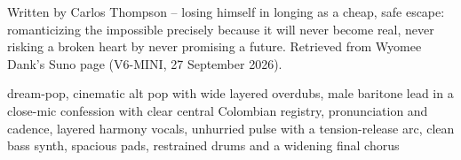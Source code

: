 
\label{sec:perderme-en-el-anhelo}
\begin{notes}
Written by Carlos Thompson -- losing himself in longing as a cheap, safe escape: romanticizing the impossible precisely because it will never become real, never risking a broken heart by never promising a future. Retrieved from Wyomee Dank's Suno page (V6-MINI, 27 September 2026).
\end{notes}
\begin{style}
dream-pop, cinematic alt pop with wide layered overdubs, male baritone lead in a close-mic confession with clear central Colombian registry, pronunciation and cadence, layered harmony vocals, unhurried pulse with a tension-release arc, clean bass synth, spacious pads, restrained drums and a widening final chorus
\end{style}
